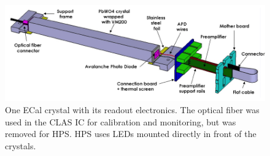 \begin{figure}[ht]
    \includegraphics[width=\textwidth]{detector/figs/ecal_module}
    \caption{One ECal crystal with its readout electronics. The optical fiber was used in the CLAS IC for calibration and monitoring, but was removed for HPS. HPS uses LEDs mounted directly in front of the crystals.}
    \label{fig:ecal_module}
\end{figure}

